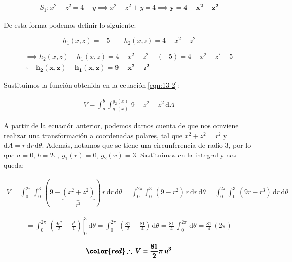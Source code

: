 \documentclass[12pt]{article}
\begin{document}
\begin{align*}
	S_1:x^2+z^2=4-y \implies x^2+z^2+y=4 \implies \boldsymbol{y=4-x^2-z^2}
\end{align*}

\noindent De esta forma podemos definir lo siguiente:

\begin{equation*}
	h_1(x,z) = -5 \qquad
	h_2(x,z) = 4-x^2-z^2
\end{equation*}

\begin{align*}
	\implies h_2(x,z) - h_1(x,z) = 4-x^2-z^2 - (-5) = 4-x^2-z^2 + 5\\
	\therefore \quad \boldsymbol{h_2(x,z) - h_1(x,z) = 9-x^2-z^2}
\end{align*}

\noindent Sustituimos la función obtenida en la ecuación \eqref{eqn:13-2}:

\begin{align*}
	V = \int_{a}^{b}\int_{g_1(x)}^{g_2(x)}\, 9-x^2-z^2\, \mathrm{d}A
\end{align*}

\noindent A partir de la ecuación anterior, podemos darnos cuenta de que nos conviene realizar una transformación a coordenadas polares, tal que $x^2+z^2 = r^2$ y $\mathrm{d}A = r\, \mathrm{d}r\,\mathrm{d}\theta
$. Además, notamos que se tiene una circunferencia de radio 3, por lo que $a=0,\, b=2\pi,\, g_1(x)=0,\, g_2(x)=3$. Sustituimos en la integral y nos queda:

\begin{align*}
	V = \int_{0}^{2\pi}\int_{0}^{3}\, (9-\underbrace{(x^2+z^2)}_{\text{$r^2$}})\, r\, \mathrm{d}r\,\mathrm{d}\theta = \int_{0}^{2\pi}\int_{0}^{3}\, (9-r^2)\, r\, \mathrm{d}r\,\mathrm{d}\theta = \int_{0}^{2\pi}\int_{0}^{3}\, (9r-r^3)\, \mathrm{d}r\,\mathrm{d}\theta
\end{align*}

\begin{align*}
	= \int_{0}^{2\pi}\, \left.\left(\frac{9r^2}{2}-\frac{r^4}{4}\right)\right|_0^3\ \mathrm{d}\theta = \int_{0}^{2\pi}\, \left(\frac{81}{2}-\frac{81}{4}\right)\,\mathrm{d}\theta = \frac{81}{4}\, \int_{0}^{2\pi}\, \mathrm{d}\theta = \frac{81}{4}\,(2\pi)
\end{align*}

\begin{align}
	\pmb{\color{red} \therefore\: V = \frac{81}{2}\pi\: u^3}
\end{align}
\end{document}
